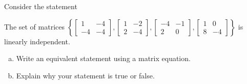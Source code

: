 
\begin{exerciseStatement}


Consider the statement 
\begin{center}\begin{minipage}{0.8\textwidth}
 The set of matrices \( \left\{ \left[\begin{array}{cc}
1 & -4 \\
-4 & -4
\end{array}\right] , \left[\begin{array}{cc}
1 & -2 \\
2 & -4
\end{array}\right] , \left[\begin{array}{cc}
-4 & -1 \\
2 & 0
\end{array}\right] , \left[\begin{array}{cc}
1 & 0 \\
8 & -4
\end{array}\right] \right\} \) is linearly independent.
\end{minipage}\end{center}
    


\begin{enumerate}[(a)]
\item  Write an equivalent statement using a matrix equation.
\item  Explain why your statement is true or false.
\end{enumerate}
    
\end{exerciseStatement}
    
